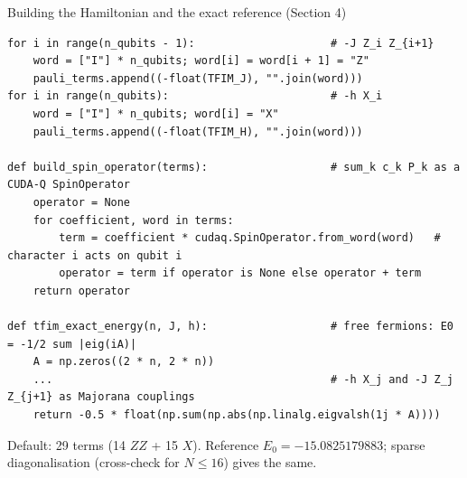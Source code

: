 \documentclass[aspectratio=169,11pt]{beamer}
\begin{document}
\begin{frame}[fragile]{Building the Hamiltonian and the exact reference (Section 4)}
\begin{lstlisting}
for i in range(n_qubits - 1):                     # -J Z_i Z_{i+1}
    word = ["I"] * n_qubits; word[i] = word[i + 1] = "Z"
    pauli_terms.append((-float(TFIM_J), "".join(word)))
for i in range(n_qubits):                         # -h X_i
    word = ["I"] * n_qubits; word[i] = "X"
    pauli_terms.append((-float(TFIM_H), "".join(word)))

def build_spin_operator(terms):                   # sum_k c_k P_k as a CUDA-Q SpinOperator
    operator = None
    for coefficient, word in terms:
        term = coefficient * cudaq.SpinOperator.from_word(word)   # character i acts on qubit i
        operator = term if operator is None else operator + term
    return operator

def tfim_exact_energy(n, J, h):                   # free fermions: E0 = -1/2 sum |eig(iA)|
    A = np.zeros((2 * n, 2 * n))
    ...                                           # -h X_j and -J Z_j Z_{j+1} as Majorana couplings
    return -0.5 * float(np.sum(np.abs(np.linalg.eigvalsh(1j * A))))
\end{lstlisting}
  \small Default: 29 terms (14 $ZZ$ + 15 $X$). Reference $E_0 = -15.0825179883$; sparse diagonalisation (cross-check for $N \le 16$) gives the same.
\end{frame}
\end{document}

